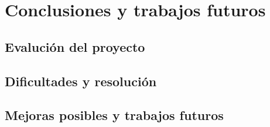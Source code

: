 \chapter{Conclusiones y trabajos futuros}\label{cap:conclusiones}

\section{Evalución del proyecto}

\section{Dificultades y resolución}

\section{Mejoras posibles y trabajos futuros}
